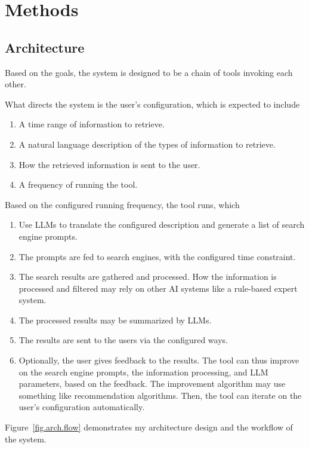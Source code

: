 \documentclass[final-report]{report-template}
\begin{document}
\section{Methods} 
\subsection{Architecture}
Based on the goals, the system is designed to be a chain of tools invoking each
other.

What directs the system is the user's configuration, which is expected to
include
\begin{enumerate}
	\item A time range of information to retrieve.
	\item A natural language description of the types of information to
		retrieve.
	\item How the retrieved information is sent to the user.
	\item A frequency of running the tool.
\end{enumerate}

Based on the configured running frequency, the tool runs, which
\begin{enumerate}
	\item Use LLMs to translate the configured description and generate a list
		of search engine prompts.
	\item The prompts are fed to search engines, with the configured time
		constraint.
	\item The search results are gathered and processed. How the information is
		processed and filtered may rely on other AI systems like a
		rule-based expert system.
	\item The processed results may be summarized by LLMs.
	\item The results are sent to the users via the configured ways.
	\item Optionally, the user gives feedback to the results. The tool can
		thus improve on the search engine prompts, the information processing,
		and LLM parameters, based on the feedback. The improvement algorithm
		may use something like recommendation algorithms. Then, the tool can
		iterate on the user's configuration automatically.
\end{enumerate}

Figure~\ref{fig.arch.flow} demonstrates my architecture design and the workflow
of the system.
\end{document}
